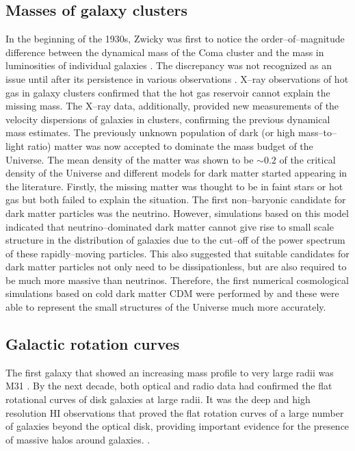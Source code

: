 \documentclass[a4wide,12pt]{book}
\newcommand{\ignore}[1]{}
\begin{document}
{\subsection{Masses of galaxy clusters}
In the beginning of the 1930s, Zwicky was first to notice the order--of--magnitude difference between the dynamical mass of the Coma cluster and the mass in luminosities of individual galaxies \citep[][]{Zwicky1933}. The discrepancy was not recognized as an issue until after its persistence in various observations \citep[][]{Rubin.Ford1970, Einasto+1974, Ostriker+1974}. X--ray observations of hot gas in galaxy clusters confirmed that the hot gas reservoir cannot explain the missing mass. The X--ray data, additionally, provided new measurements of the velocity dispersions of galaxies in clusters, confirming the previous dynamical mass estimates\ignore{(Forman et al. 1972, Gursky et al. 1972, Kellogg et al. 1973)}. The previously unknown population of dark (or high mass--to--light ratio) matter was now accepted to dominate the mass budget of the Universe. The mean density of the matter was shown to be $\sim 0.2$ of the critical density of the Universe and different models for dark matter started appearing in the literature. Firstly, the missing matter was thought to be in faint stars or hot gas but both failed to explain the situation\ignore{cite and explain why! or maybe not as it's not really important now!!}. The first non--baryonic candidate for dark matter particles was the neutrino. However, simulations based on this model \citep[][]{Doroshkevich+1978} indicated that neutrino--dominated dark matter cannot give rise to small scale structure in the distribution of galaxies due to the cut--off of the power spectrum of these rapidly--moving particles. This also suggested that suitable candidates for dark matter particles not only need to be dissipationless, but are also required to be much more massive than neutrinos\ignore{(Blumenthal et al. 1982, Bond et al. 1982, Peebles, 1982)}. Therefore, the first numerical cosmological simulations based on cold dark matter CDM were performed by \citep[][]{Melott+1983} and these were able to represent the small structures of the Universe much more accurately.

\subsection{Galactic rotation curves}
The first galaxy that showed an increasing mass profile to very large radii was M31 \citep[][]{Rubin.Ford1970}. By the next decade, both optical\ignore{ (Rubin+1978, Rubin+1980)} and radio\ignore{ (Bosma 1978)} data had confirmed the flat rotational curves of disk galaxies at large radii. It was the deep and high resolution HI observations that proved the flat rotation curves of a large number of galaxies beyond the optical disk, providing important evidence for the presence of massive halos around galaxies. \citet[see e.g.][]{Bosma1981, Begeman1989}. 

}
\end{document}
